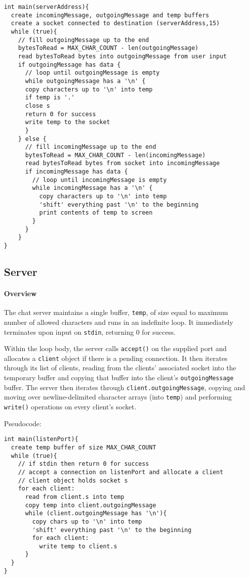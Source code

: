 \documentclass[]{article}
\begin{document}
\begin{lstlisting}
int main(serverAddress){
  create incomingMessage, outgoingMessage and temp buffers
  create a socket connected to destination (serverAddress,15)
  while (true){
    // fill outgoingMessage up to the end
    bytesToRead = MAX_CHAR_COUNT - len(outgoingMessage)
	read bytesToRead bytes into outgoingMessage from user input
	if outgoingMessage has data {
	  // loop until outgoingMessage is empty
  	  while outgoingMessage has a '\n' {
	  copy characters up to '\n' into temp
	  if temp is '.'
  	  close s
	  return 0 for success
	  write temp to the socket
	  }
	} else {
	  // fill incomingMessage up to the end
	  bytesToRead = MAX_CHAR_COUNT - len(incomingMessage)
	  read bytesToRead bytes from socket into incomingMessage
	  if incomingMessage has data {
	    // loop until incomingMessage is empty
	    while incomingMessage has a '\n' {
	      copy characters up to '\n' into temp
	      'shift' everything past '\n' to the beginning
	      print contents of temp to screen
	    }
	  }
	} 	
}
\end{lstlisting}
\subsection{Server}
\paragraph{Overview}
The chat server maintains a single buffer, \texttt{temp}, of size equal to maximum number of allowed characters and runs in an indefinite loop. It immediately terminates upon input on \texttt{stdin}, returning 0 for success.

Within the loop body, the server calls \texttt{accept()} on the supplied port and allocates a \texttt{client} object if there is a pending connection. It then iterates through its list of clients, reading from the clients' associated socket into the temporary buffer and copying that buffer into the client's \texttt{outgoingMessage} buffer. The server then iterates through \texttt{client.outgoingMessage}, copying and moving over newline-delimited character arrays (into \texttt{temp}) and performing \texttt{write()} operations on every client's socket.

\pagebreak

\noindent Pseudocode:

\begin{lstlisting}
int main(listenPort){
  create temp buffer of size MAX_CHAR_COUNT
  while (true){
    // if stdin then return 0 for success
    // accept a connection on listenPort and allocate a client
    // client object holds socket s
    for each client:
      read from client.s into temp
      copy temp into client.outgoingMessage
      while (client.outgoingMessage has '\n'){
        copy chars up to '\n' into temp
        'shift' everything past '\n' to the beginning
        for each client:
          write temp to client.s
      }
  }
}	
\end{lstlisting}
\end{document}
